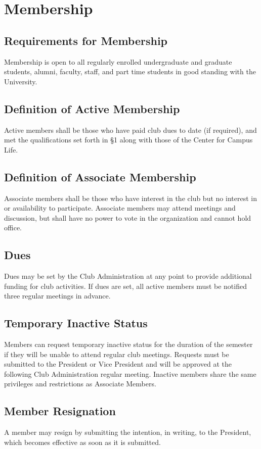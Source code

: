 \documentclass[english,11pt]{article}
\begin{document}
\section{Membership}
\subsection{Requirements for Membership}
Membership is open to all regularly enrolled undergraduate and graduate students, alumni, faculty, staff, and part time students in good standing with the University.

\subsection{Definition of Active Membership}
Active members shall be those who have paid club dues to date (if required), and met the qualifications set forth in §1 along with those of the Center for Campus Life.

\subsection{Definition of Associate Membership}
Associate members shall be those who have interest in the club but no interest in or availability to participate.
Associate members may attend meetings and discussion, but shall have no power to vote in the organization and cannot hold office.

\subsection{Dues}
Dues may be set by the Club Administration at any point to provide additional funding for club activities.
If dues are set, all active members must be notified three regular meetings in advance.

\subsection{Temporary Inactive Status}
Members can request temporary inactive status for the duration of the semester if they will be unable to attend regular club meetings. 
Requests must be submitted to the President or Vice President and will be approved at the following Club Administration regular meeting.
Inactive members share the same privileges and restrictions as Associate Members.

\subsection{Member Resignation}
A member may resign by submitting the intention, in writing, to the President, which becomes effective as soon as it is submitted.
\end{document}
